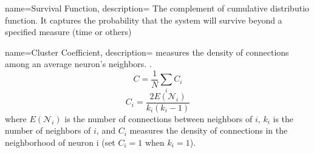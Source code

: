 {
  name=Survival Function,
  description={ The complement of cumulative distributio function. 
	It captures the probability that the system will survive beyond a specified measure (time or others)
  }
}

{
  name=Cluster Coefficient,
  description={ measures the density of connections among an average neuron's neighbors. \cite{varshney_structural_2011}.
	$$ C = \frac{1}{N} \sum_{i} C_i $$
	$$ C_i = \frac{2E(\mathcal{N}_i)}{k_i(k_i - 1)} $$
	where $ E(\mathcal{N}_i) $ is the number of connections between neighbors of $i$, $k_i$ is the number of neighbors of $i$, and $C_i$ measures the density of
connections in the neighborhood of neuron i (set $ C_i = 1 $ when $ k_i = 1 $).
  }
}
